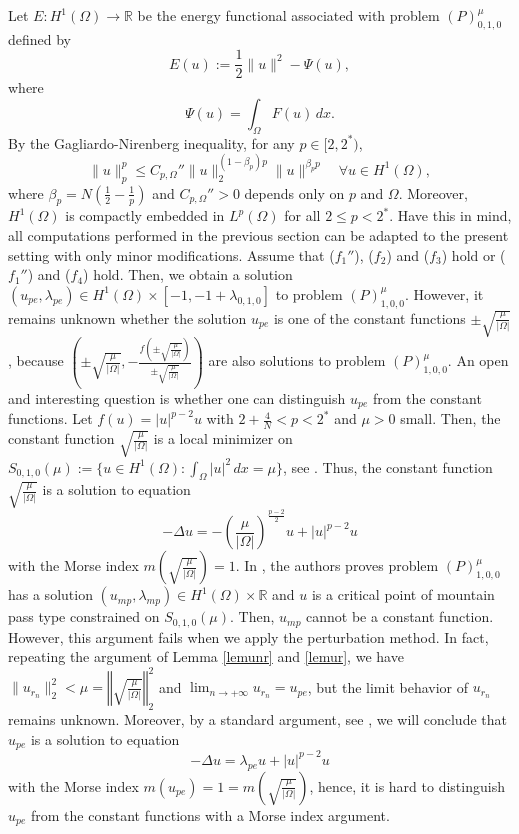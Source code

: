 \documentclass[11pt]{amsart}
\newcommand{\abs}[1]{\lvert#1\rvert}
\newcommand{\norm}[1]{\lVert#1\rVert}
\newcommand{\R}{\mathbb{R}}
\numberwithin{equation}{section}
\begin{document}
Let $E: H^1(\Omega) \to \mathbb{R}$ be the energy functional  associated with problem $(P)^\mu_{0,1,0}$ defined by
$$
E(u) := \frac{1}{2}\norm{u}^{2}-\Psi(u),
$$
where
$$
\Psi(u)=\int_\Omega  F(u)\,dx.
$$
By the Gagliardo-Nirenberg inequality, for any $p \in [2, 2^*)$,
\begin{equation}\label{eqgnn}
	\|u\|_p^p \leq C_{p,\Omega}''\|u\|_2^{(1 - \beta_p)p} \| u\|^{\beta_p p} \quad \forall u \in  H^1(\Omega),
\end{equation}
where $\beta_p = N \left( \frac{1}{2} - \frac{1}{p} \right)$ and $ C_{p,\Omega}'' > 0$ depends only on  $p$ and $\Omega$. Moreover, $H^1(\Omega)$ is compactly embedded in $L^p(\Omega)$ for all $2\leq p<2^*$. Have this in mind, all computations performed in the previous section can be adapted to the present setting with only minor modifications. Assume that  ($f_1''$), ($f_2$) and ($f_3$) hold or ($f_1''$) and ($f_4$) hold. Then, we obtain a solution $(u_{pe},\lambda_{pe})\in H^1(\Omega)\times [-1,-1+\lambda_{0,1,0}]$ to problem $(P)^{\mu}_{1,0,0}$. However,  it remains unknown whether the solution $u_{pe}$ is one of the constant functions $\pm\sqrt{\frac{\mu}{\abs{\Omega}}}$, because $\left(\pm\sqrt{\frac{\mu}{\abs{\Omega}}}, -\frac{f\left(\pm\sqrt{\frac{\mu}{\abs{\Omega}}}\right)}{\pm\sqrt{\frac{\mu}{\abs{\Omega}}}}\right)$ are also solutions to problem $(P)^{\mu}_{1,0,0}$.  An open and interesting question is whether one can distinguish  $u_{pe}$ from the constant functions. Let $f(u)=\abs{u}^{p-2}u$ with $2+\frac{4}{N}<p<2^*$ and $\mu >0$ small. Then, the constant function $\sqrt{\frac{\mu}{\abs{\Omega}}}$ is a local minimizer on $S_{0,1,0}(\mu):=\{u \in H^1(\Omega): \int_{\Omega}\abs{u}^2\, dx=\mu\}$, see \cite[Remark 3.6]{Chang}. Thus, the constant function $\sqrt{\frac{\mu}{\abs{\Omega}}}$ is a solution to equation
$$
-\Delta u=-\left(\frac{\mu}{\abs{\Omega}}\right)^\frac{p-2}{2} u+\abs{u}^{p-2}u
$$ with the Morse index $m\left(\sqrt{\frac{\mu}{\abs{\Omega}}}\right)=1$. In \cite[Remark 3.6]{Chang}, the authors proves problem $(P)^{\mu}_{1,0,0}$ has a solution $(u_{mp},\lambda_{mp})\in H^1(\Omega)\times \R$ and $u$ is a critical point of mountain pass type constrained on $S_{0,1,0}(\mu)$. Then, $u_{mp}$ cannot be a constant function. However, this argument fails when we apply the perturbation method. In fact, repeating the argument of Lemma \ref{lemunr} and \ref{lemur}, we have $\norm{u_{r_n}}^2_2<\mu=\left\Vert\sqrt{\frac{\mu}{\abs{\Omega}}}\right\Vert_2^2$ and $\displaystyle \lim_{n \to +\infty}u_{r_n}=u_{pe}$, but the limit behavior of $u_{r_n}$ remains unknown. Moreover, by a standard argument, see \cite{Chang,Bu}, we will conclude that $u_{pe}$ is a solution to equation
$$
-\Delta u=\lambda_{pe} u+\abs{u}^{p-2}u
$$ with the Morse index $m(u_{pe})=1=m\left(\sqrt{\frac{\mu}{\abs{\Omega}}}\right)$, hence, it is hard to distinguish $u_{pe}$ from the constant functions with a Morse index argument.
\end{document}
